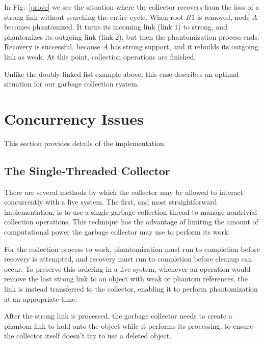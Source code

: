 In Fig.~\ref{prove} we see the situation where the collector recovers from the
loss of a strong link without searching the entire cycle. When root $R1$ is removed,
node $A$ becomes phantomized. It turns its incoming link (link $1$) to strong,
and phantomizes its outgoing link (link $2$), but
then the phantomization process ends. Recovery is successful, because $A$ has strong
support, and it rebuilds its outgoing link as weak. At this point, collection
operations are finished.

Unlike the doubly-linked list example above, this case describes an optimal
situation for our garbage collection system.

\section{Concurrency Issues}

This section provides details of the implementation.

\subsection{The Single-Threaded Collector}
There are several methods by which the collector may be
allowed to interact concurrently with a live system. The first, and most straightforward
implementation, is to use a single garbage collection thread to manage nontrivial
collection operations. This technique has the advantage of limiting the amount
of computational power the garbage collector may use to perform its work.

For the collection process to work, phantomization must run to completion before
recovery is attempted, and recovery must run to completion before cleanup can
occur. To preserve this ordering in a live system,
whenever an operation would remove the last strong link
to an object with weak or phantom references, the link is instead transferred
to the collector, enabling it to perform phantomization at an appropriate time.

After the strong link is processed, the garbage collector needs to create a phantom
link to hold onto the object while it performs its processing, to ensure the
collector itself doesn't try to use a deleted object.

